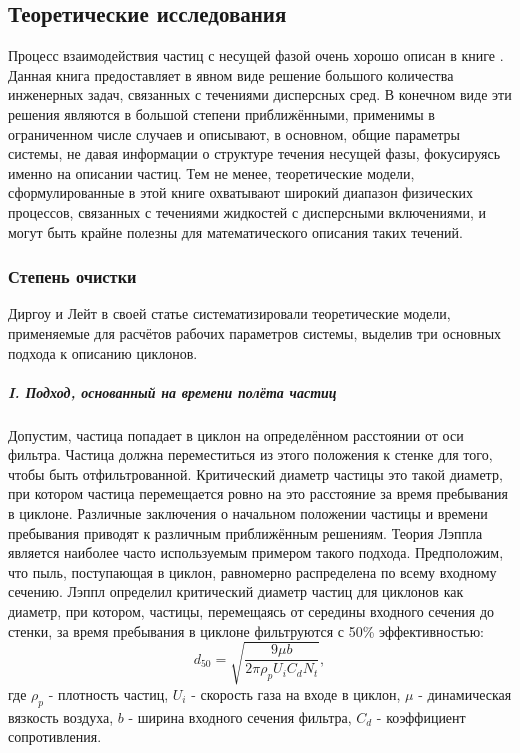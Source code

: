 	\subsection{Теоретические исследования}
	\label{theoreticalOverview}
		\hspace{1em}
		Процесс взаимодействия частиц с несущей фазой очень хорошо описан в книге \cite{Richardson}. Данная книга предоставляет в явном виде решение большого количества инженерных задач, связанных с течениями дисперсных сред. В конечном виде эти решения являются в большой степени приближёнными, применимы в ограниченном числе случаев и описывают, в основном, общие параметры системы, не давая информации о структуре течения несущей фазы, фокусируясь именно на описании частиц. Тем не менее, теоретические модели, сформулированные в этой книге охватывают широкий диапазон физических процессов, связанных с течениями жидкостей с дисперсными включениями, и могут быть крайне полезны для математического описания таких течений.
		\subsubsection*{Степень очистки}
		Диргоу и Лейт \cite{DirgoLeith} в своей статье систематизировали теоретические модели, применяемые для расчётов рабочих параметров системы, выделив три основных подхода к описанию циклонов.
			\subparagraph{I. Подход, основанный на времени полёта частиц\\}
			Допустим, частица попадает в циклон на определённом расстоянии от оси фильтра. Частица должна переместиться из этого положения к стенке для того, чтобы быть отфильтрованной. Критический диаметр частицы это такой диаметр, при котором частица перемещается ровно на это расстояние за время пребывания в циклоне. Различные заключения о начальном положении частицы и времени пребывания приводят к различным приближённым решениям. Теория Лэппла \cite{Lapple} является наиболее часто используемым примером такого подхода. Предположим, что пыль, поступающая в циклон, равномерно распределена по всему входному сечению. Лэппл определил критический диаметр частиц для циклонов как диаметр, при котором, частицы, перемещаясь от середины входного сечения до стенки, за время пребывания в циклоне фильтруются с 50\% эффективностью:
			\begin{equation}
				\label{LappleEquation}
				d_{50} = \sqrt{\frac{9\mu b}{2 \pi \rho_p U_i C_d N_t}},
			\end{equation}
			где $\rho_p$ - плотность частиц, $U_i$ - скорость газа на входе в циклон, $\mu$ - динамическая вязкость воздуха, $b$ - ширина входного сечения фильтра, $C_d$ - коэффициент сопротивления.
			
